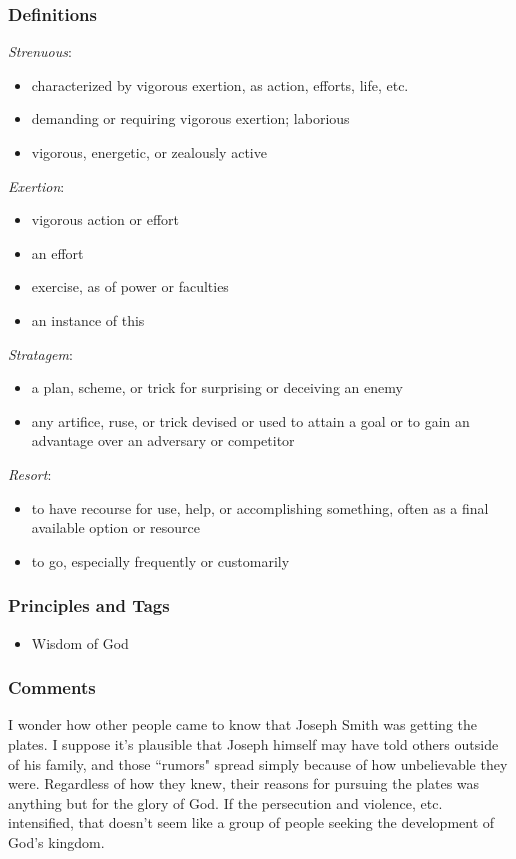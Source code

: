 \documentclass[12pt]{report}
\begin{document}
\subsubsection{Definitions\label{js:DFN23}}
\emph{Strenuous}: \begin{itemize}
\item characterized by vigorous exertion, as action, efforts, life, etc.
\item demanding or requiring vigorous exertion; laborious
\item vigorous, energetic, or zealously active
\end{itemize}
\emph{Exertion}: \begin{itemize}
\item vigorous action or effort
\item an effort
\item exercise, as of power or faculties
\item an instance of this
\end{itemize}
\emph{Stratagem}: \begin{itemize}
\item a plan, scheme, or trick for surprising or deceiving an enemy
\item any artifice, ruse, or trick devised or used to attain a goal or to gain an advantage over an adversary or competitor
\end{itemize}
\emph{Resort}: \begin{itemize}
\item to have recourse for use, help, or accomplishing something, often as a final available option or resource
\item to go, especially frequently or customarily
\end{itemize}

\subsubsection{Principles and Tags\label{js:principles23}}
\begin{itemize}
\item {}Wisdom of God
\end{itemize}

\subsubsection{Comments\label{js:comments23}}
I wonder how other people came to know that Joseph Smith was getting the plates.  I suppose it's plausible that Joseph himself may have told others outside of his family, and those ``rumors" spread simply because of how unbelievable they were. Regardless of how they knew, their reasons for pursuing the plates was anything but for the glory of God.  If the persecution and violence, etc. intensified, that doesn't seem like a group of people seeking the development of God's kingdom.
\end{document}
